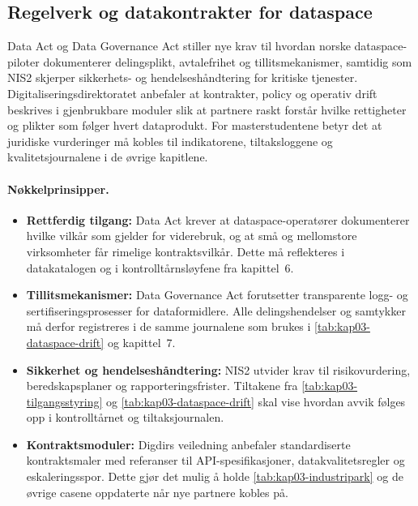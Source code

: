 \subsection{Regelverk og datakontrakter for dataspace}
Data Act og Data Governance Act stiller nye krav til hvordan norske dataspace-piloter dokumenterer delingsplikt, avtalefrihet og
tillitsmekanismer, samtidig som NIS2 skjerper sikkerhets- og hendelseshåndtering for kritiske tjenester.\citep{eu2023dataact,eu2022dga,eu2022nis2}
Digitaliseringsdirektoratet anbefaler at kontrakter, policy og operativ drift beskrives i gjenbrukbare moduler slik at partnere
raskt forstår hvilke rettigheter og plikter som følger hvert dataprodukt.\citep{digdir2024datasamarbeid} For masterstudentene betyr det at
juridiske vurderinger må kobles til indikatorene, tiltaksloggene og kvalitetsjournalene i de øvrige kapitlene.

\paragraph{Nøkkelprinsipper.}
\begin{itemize}
    \item \textbf{Rettferdig tilgang:} Data Act krever at dataspace-operatører dokumenterer hvilke vilkår som gjelder for viderebruk,
    og at små og mellomstore virksomheter får rimelige kontraktsvilkår. Dette må reflekteres i datakatalogen og i kontrolltårnsløyfene
    fra kapittel~6.\citep{eu2023dataact}
    \item \textbf{Tillitsmekanismer:} Data Governance Act forutsetter transparente logg- og sertifiseringsprosesser for dataformidlere.
    Alle delingshendelser og samtykker må derfor registreres i de samme journalene som brukes i \autoref{tab:kap03-dataspace-drift}
    og kapittel~7.\citep{eu2022dga}
    \item \textbf{Sikkerhet og hendelseshåndtering:} NIS2 utvider krav til risikovurdering, beredskapsplaner og rapporteringsfrister.
    Tiltakene fra \autoref{tab:kap03-tilgangsstyring} og \autoref{tab:kap03-dataspace-drift} skal vise hvordan avvik følges opp i kontrolltårnet
    og tiltaksjournalen.\citep{eu2022nis2}
    \item \textbf{Kontraktsmoduler:} Digdirs veiledning anbefaler standardiserte kontraktsmaler med referanser til API-spesifikasjoner,
    datakvalitetsregler og eskaleringsspor. Dette gjør det mulig å holde \autoref{tab:kap03-industripark} og de øvrige casene oppdaterte
    når nye partnere kobles på.\citep{digdir2024datasamarbeid}
\end{itemize}

